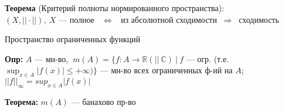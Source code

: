 \documentclass[12pt, letterpaper, twoside]{article}
\begin{document}
\vspace*{0.3cm}
\noindent
\textbf{Теорема} (Критерий полноты нормированного пространства): \\
\( (X, || \cdot ||), \ X \) --- полное \( \enspace \Leftrightarrow \enspace \) из абсолютной сходимости \( \ \Rightarrow \ \) сходимость

\begin{center}
    \vspace*{1.5cm}
    {\Large Пространство ограниченных функций}
\end{center}

\vspace*{0.3cm}
\noindent
\textbf{Опр:} \(A\) --- мн-во, \( \ m(A) = \{ f: A \rightarrow \mathbb{R} (|| \ \mathbb{C}) \ | \ f \) --- огр. (т.е. \( \sup_{x \in A} |f(x)| \leq + \infty) \} \) --- мн-во всех ограниченных ф-ий на \(A\); \( ||f||_{\infty} = sup_{x \in A} |f(x)| \)

\vspace*{0.3cm}
\noindent
\textbf{Теорема:} \( m(A) \) --- банахово пр-во
    
\end{document}
